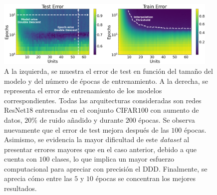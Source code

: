 \begin{figure}[h]
    \centering
    \includegraphics[width=0.95\textwidth]{img/experiments/model-epochPreActResNet18CIFAR100augmented.png}
    \caption[Doble descenso en función del tamaño del modelo y del número de épocas para la red ResNet$18$ y el conjunto CIFAR$100$.]{A la izquierda, se muestra el error de test en función del tamaño del modelo y del número de épocas de entrenamiento. A la derecha, se representa el error de entrenamiento de los modelos correspondientes. Todas las arquitecturas consideradas son redes ResNet$18$ entrenadas en el conjunto CIFAR$100$ con aumento de datos, $20\%$ de ruido añadido y durante $200$ épocas. Se observa nuevamente que el error de test mejora después de las $100$ épocas. Asimismo, se evidencia la mayor dificultad de este \textit{dataset} al presentar errores mayores que en el caso anterior, debido a que cuenta con $100$ clases, lo que implica un mayor esfuerzo computacional para apreciar con precisión el DDD. Finalmente, se aprecia cómo entre las $5$ y $10$ épocas se concentran los mejores resultados.}\label{fig:model-epochPreActResNet18CIFAR100}
\end{figure}

